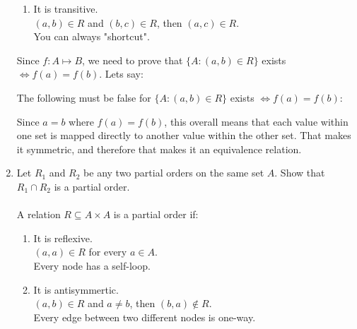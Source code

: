 \documentclass[letterpaper,11pt]{article}
\begin{document}
\begin{enumerate}
\begin{enumerate}
		    \item It is transitive.\\
		    $(a,b)\in R$ and $(b,c)\in R$, then $(a,c)\in R$.\\
		    You can always "shortcut".
		\end{enumerate}
		
		Since $f:A\mapsto B$, we need to prove that $\{A: (a,b) \in R \}$ exists $\iff f(a)=f(b)$. Lets say:
		
		The following must be false for $\{A: (a,b) \in R \}$ exists $\iff f(a)=f(b)$:
		
		Since $a=b$ where $f(a)=f(b)$, this overall means that each value within one set is mapped directly to another value within the other set. That makes it symmetric, and therefore that makes it an equivalence relation.
		
		
		
		
		
		
		
		
		\newpage
		\item Let $R_1$ and $R_2$ be any two partial orders on the same set $A$. Show that $R_1\cap R_2$ is a partial order.\\\\
		
        A relation $R \subseteq A\times A$ is a partial order if:
		\begin{enumerate}
		    \item It is reflexive.\\
		    $(a,a)\in R$ for every $a \in A$.\\
		    Every node has a self-loop.\\
		    
		    \item It is antisymmertic.\\
		    $(a,b)\in R$ and $a \not= b$, then $(b,a)\not\in R$.\\
		    Every edge between two different nodes is one-way.\\
		    

\end{enumerate}
\end{enumerate}
\end{document}

